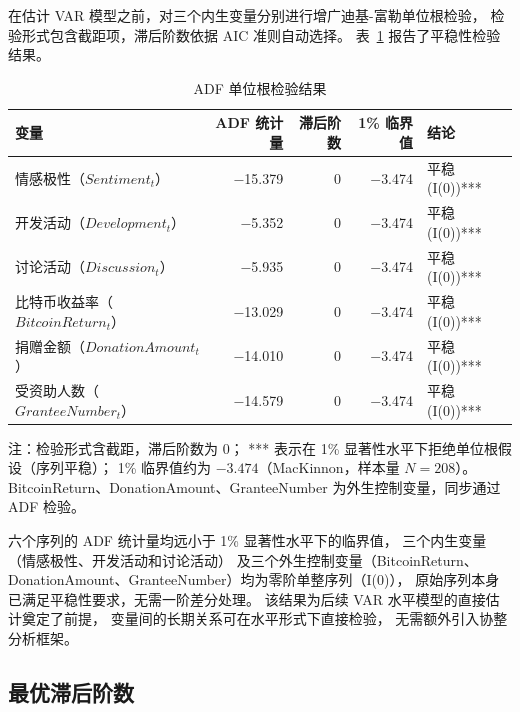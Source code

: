 在估计 VAR 模型之前，对三个内生变量分别进行增广迪基-富勒单位根检验，
检验形式包含截距项，滞后阶数依据 AIC 准则自动选择。
表~\ref{tab:adf-test} 报告了平稳性检验结果。

\begin{table}[htbp]
    \centering
    \small
    \caption{ADF 单位根检验结果}
    \label{tab:adf-test}
    \begin{tabularx}{\textwidth}{Xrrrp{3.5cm}}
        \toprule
        变量 & ADF 统计量 & 滞后阶数 & 1\% 临界值 & 结论 \\
        \midrule
        情感极性（$Sentiment_t$） & $-$15.379 & 0 & $-$3.474 & 平稳 (I(0))*** \\
        开发活动（$Development_t$）      & $-$5.352  & 0 & $-$3.474 & 平稳 (I(0))*** \\
        讨论活动（$Discussion_t$）   & $-$5.935  & 0 & $-$3.474 & 平稳 (I(0))*** \\
        比特币收益率（$BitcoinReturn_t$）    & $-$13.029 & 0 & $-$3.474 & 平稳 (I(0))*** \\
        捐赠金额（$DonationAmount_t$）  & $-$14.010 & 0 & $-$3.474 & 平稳 (I(0))*** \\
        受资助人数（$GranteeNumber_t$）     & $-$14.579 & 0 & $-$3.474 & 平稳 (I(0))*** \\
        \bottomrule
    \end{tabularx}
    \begin{minipage}{\textwidth}
        \vspace{0.3em}
        \footnotesize 注：检验形式含截距，滞后阶数为 0；
        *** 表示在 1\% 显著性水平下拒绝单位根假设（序列平稳）；
        1\% 临界值约为 $-3.474$（MacKinnon，样本量 $N = 208$）。
        BitcoinReturn、DonationAmount、GranteeNumber 为外生控制变量，同步通过 ADF 检验。
    \end{minipage}
\end{table}

六个序列的 ADF 统计量均远小于 1\% 显著性水平下的临界值，
三个内生变量（情感极性、开发活动和讨论活动）
及三个外生控制变量（BitcoinReturn、DonationAmount、GranteeNumber）均为零阶单整序列（I(0)），
原始序列本身已满足平稳性要求，无需一阶差分处理。
该结果为后续 VAR 水平模型的直接估计奠定了前提，
变量间的长期关系可在水平形式下直接检验，
无需额外引入协整分析框架。

\subsection{最优滞后阶数}

